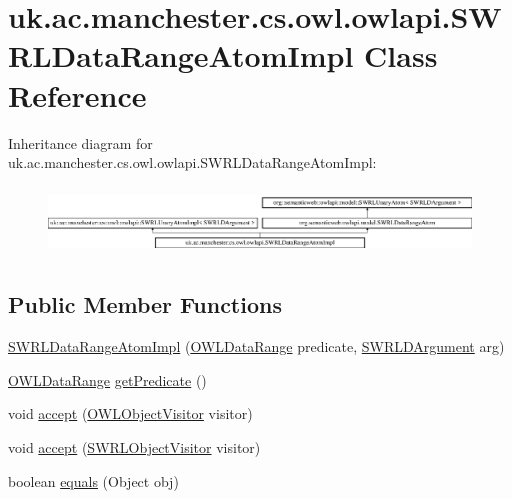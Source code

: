 \hypertarget{classuk_1_1ac_1_1manchester_1_1cs_1_1owl_1_1owlapi_1_1_s_w_r_l_data_range_atom_impl}{\section{uk.\-ac.\-manchester.\-cs.\-owl.\-owlapi.\-S\-W\-R\-L\-Data\-Range\-Atom\-Impl Class Reference}
\label{classuk_1_1ac_1_1manchester_1_1cs_1_1owl_1_1owlapi_1_1_s_w_r_l_data_range_atom_impl}
}
Inheritance diagram for uk.\-ac.\-manchester.\-cs.\-owl.\-owlapi.\-S\-W\-R\-L\-Data\-Range\-Atom\-Impl\-:\begin{figure}[H]
\begin{center}
\leavevmode
\includegraphics[height=1.846154cm]{classuk_1_1ac_1_1manchester_1_1cs_1_1owl_1_1owlapi_1_1_s_w_r_l_data_range_atom_impl}
\end{center}
\end{figure}
\subsection*{Public Member Functions}
\begin{DoxyCompactItemize}
\item 
\hyperlink{classuk_1_1ac_1_1manchester_1_1cs_1_1owl_1_1owlapi_1_1_s_w_r_l_data_range_atom_impl_a70c8a4657782f63813f9350e81f3243f}{S\-W\-R\-L\-Data\-Range\-Atom\-Impl} (\hyperlink{interfaceorg_1_1semanticweb_1_1owlapi_1_1model_1_1_o_w_l_data_range}{O\-W\-L\-Data\-Range} predicate, \hyperlink{interfaceorg_1_1semanticweb_1_1owlapi_1_1model_1_1_s_w_r_l_d_argument}{S\-W\-R\-L\-D\-Argument} arg)
\item 
\hyperlink{interfaceorg_1_1semanticweb_1_1owlapi_1_1model_1_1_o_w_l_data_range}{O\-W\-L\-Data\-Range} \hyperlink{classuk_1_1ac_1_1manchester_1_1cs_1_1owl_1_1owlapi_1_1_s_w_r_l_data_range_atom_impl_ac0acb79872b1dc5968a64b67438f7328}{get\-Predicate} ()
\item 
void \hyperlink{classuk_1_1ac_1_1manchester_1_1cs_1_1owl_1_1owlapi_1_1_s_w_r_l_data_range_atom_impl_afeeef1b443826c2f3a274214e987c1d7}{accept} (\hyperlink{interfaceorg_1_1semanticweb_1_1owlapi_1_1model_1_1_o_w_l_object_visitor}{O\-W\-L\-Object\-Visitor} visitor)
\item 
void \hyperlink{classuk_1_1ac_1_1manchester_1_1cs_1_1owl_1_1owlapi_1_1_s_w_r_l_data_range_atom_impl_ad54dda23406121309f6a5c85da9b3b7b}{accept} (\hyperlink{interfaceorg_1_1semanticweb_1_1owlapi_1_1model_1_1_s_w_r_l_object_visitor}{S\-W\-R\-L\-Object\-Visitor} visitor)
\item 
boolean \hyperlink{classuk_1_1ac_1_1manchester_1_1cs_1_1owl_1_1owlapi_1_1_s_w_r_l_data_range_atom_impl_afc03e61817a974380273e7b5a52c3e0d}{equals} (Object obj)
\end{DoxyCompactItemize}
